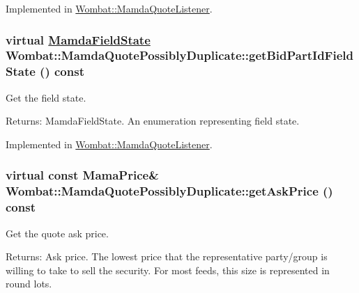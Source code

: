 Implemented in \hyperlink{classWombat_1_1MamdaQuoteListener_0256d6b1b2181919a00cf6d6e903b014}{Wombat::Mamda\-Quote\-Listener}.\hypertarget{classWombat_1_1MamdaQuotePossiblyDuplicate_9b3ff8e4320ac2cf412599420c5e3b81}{
\subsubsection[getBidPartIdFieldState]{\setlength{\rightskip}{0pt plus 5cm}virtual \hyperlink{namespaceWombat_93aac974f2ab713554fd12a1fa3b7d2a}{Mamda\-Field\-State} Wombat::Mamda\-Quote\-Possibly\-Duplicate::get\-Bid\-Part\-Id\-Field\-State () const}}
\label{classWombat_1_1MamdaQuotePossiblyDuplicate_9b3ff8e4320ac2cf412599420c5e3b81}


Get the field state. 

\begin{Desc}
\item[Returns:]Mamda\-Field\-State. An enumeration representing field state. \end{Desc}


Implemented in \hyperlink{classWombat_1_1MamdaQuoteListener_01e681d0b51718516807df702714f7ba}{Wombat::Mamda\-Quote\-Listener}.\hypertarget{classWombat_1_1MamdaQuotePossiblyDuplicate_5b73feb8586edb3073cdd904665c510a}{
\subsubsection[getAskPrice]{\setlength{\rightskip}{0pt plus 5cm}virtual const Mama\-Price\& Wombat::Mamda\-Quote\-Possibly\-Duplicate::get\-Ask\-Price () const}}
\label{classWombat_1_1MamdaQuotePossiblyDuplicate_5b73feb8586edb3073cdd904665c510a}


Get the quote ask price. 

\begin{Desc}
\item[Returns:]Ask price. The lowest price that the representative party/group is willing to take to sell the security. For most feeds, this size is represented in round lots. \end{Desc}


